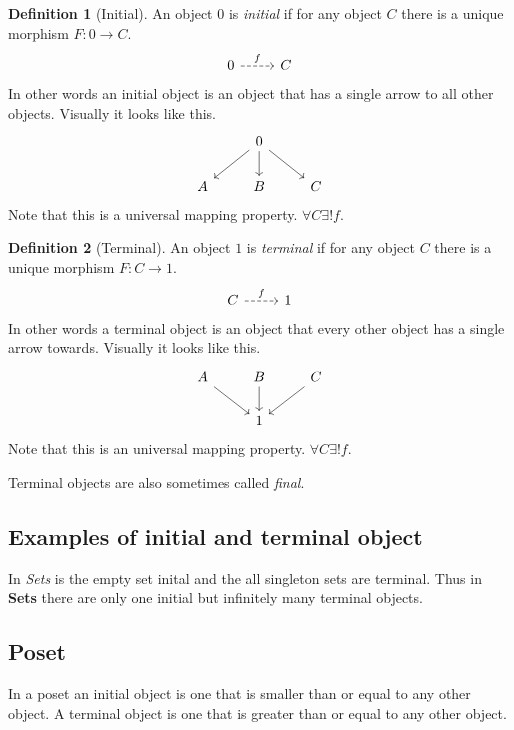 \documentclass{book}
\theoremstyle{definition}
\newtheorem{definition}{Definition}[section]
\newcommand{\arr}[3]{#1 : #2 \rightarrow #3}
\begin{document}
\begin{definition}[Initial]
  An object $0$ is \emph{initial} if for any object $C$ there is a unique
  morphism $\arr{F}{0}{C}$.
  \[
    \begin{tikzcd}
      0 \arrow[r, dashrightarrow, "f"] & C
    \end{tikzcd}
  \]
  In other words an initial object is an object that has a single arrow to all
  other objects. Visually it looks like this.
  \[
    \begin{tikzcd}
      & 0 \arrow[ld] \arrow[d] \arrow[rd] \\
      A & B & C
    \end{tikzcd}
  \]
  Note that this is a universal mapping property. $\forall C \exists! f$.
\end{definition}

\begin{definition}[Terminal]
  An object $1$ is \emph{terminal} if for any object $C$ there is a unique
  morphism $F : C \to 1$.
  \[
    \begin{tikzcd}
      C \arrow[r, dashrightarrow, "f"] & 1
    \end{tikzcd}
  \]
  In other words a terminal object is an object that every other object has a
  single arrow towards. Visually it looks like this.
  \[
    \begin{tikzcd}
      A \arrow[rd] & B \arrow[d] & C \arrow[ld] \\
      & 1
    \end{tikzcd}
  \]
  Note that this is an universal mapping property. $\forall C \exists! f$.
\end{definition}

Terminal objects are also sometimes called \emph{final}.

\subsection{Examples of initial and terminal object}

In \emph{Sets} is the empty set inital and the all singleton sets are
terminal. Thus in \textbf{Sets} there are only one initial but infinitely many
terminal objects.

\subsection{Poset}

In a poset an initial object is one that is smaller than or equal to any other
object. A terminal object is one that is greater than or equal to any other
object.
\end{document}
